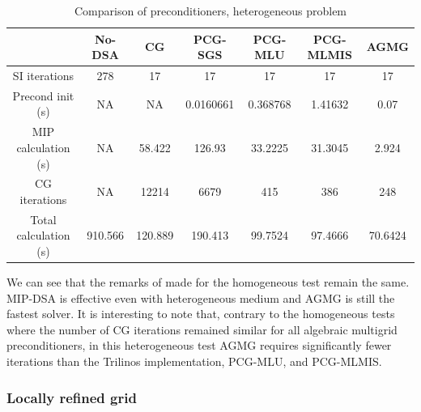 \begin{table}[H]
  \begin{center}
    \caption{Comparison of preconditioners, heterogeneous problem}
    \begin{tabular}{|c|c|c|c|c|c|c|}
      \hline
      & No-DSA & CG & PCG-SGS & PCG-MLU & PCG-MLMIS & AGMG\\
      \hline
      SI iterations & 278     & 17      & 17        & 17       & 17      & 17  \\
   Precond init (s) & NA      & NA      & 0.0160661 & 0.368768 & 1.41632 &
      0.07  \\
MIP calculation (s) & NA      & 58.422  & 126.93    & 33.2225  & 31.3045 &
      2.924 \\
      CG iterations & NA      & 12214   & 6679      & 415      & 386     & 248  \\
Total calculation (s) & 910.566 & 120.889 & 190.413 & 99.7524  & 97.4666 &
      70.6424 \\      
      \hline
    \end{tabular}
    \label{comparison_hex}
  \end{center}
\end{table}
We can see that the remarks of  made for the homogeneous test
remain the same. MIP-DSA is effective even with heterogeneous medium and AGMG is
still the fastest solver. It is interesting to note that, contrary to the
homogeneous tests where the number of CG iterations remained similar for all
algebraic multigrid preconditioners, in this heterogeneous test AGMG requires
significantly fewer iterations than the Trilinos implementation, PCG-MLU, 
and PCG-MLMIS.

\subsubsection{Locally refined grid}

